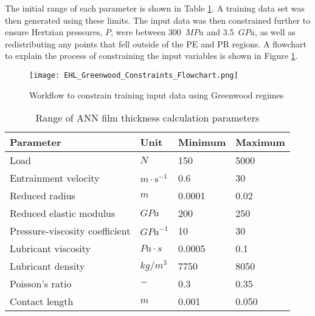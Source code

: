 The initial range of each parameter is shown in Table \ref{Range of ANN film thickness calculation parameters}. A training data set was then generated using these limits. The input data was then constrained further to ensure Hertzian pressures, $P$, were between 300~$MPa$ and 3.5~$GPa$, as well as redistributing any points that fell outside of the PE and PR regions. A flowchart to explain the process of constraining the input variables is shown in Figure \ref{EHL_Greenwood_Constraints_Flowchart}.

\begin{figure}
	\centering  
	\texttt{[image: EHL\_Greenwood\_Constraints\_Flowchart.png]}
	\caption{Workflow to constrain training input data using Greenwood regimes}
	\label{EHL_Greenwood_Constraints_Flowchart}
\end{figure} 



\begin{table*}
	\caption{Range of ANN film thickness calculation parameters}
	\label{Range of ANN film thickness calculation parameters}
	\centering
	\renewcommand{\arraystretch}{1.5}%
	\begin{tabular}{|P{0.4\textwidth}|P{0.15\textwidth}|P{0.15\textwidth}|P{0.15\textwidth}|}
		\hline
		\textbf{Parameter} & \textbf{Unit} & \textbf{Minimum} & \textbf{Maximum} \\ [0.5ex]
		\hline
		Load & $N$ & 150 & 5000 \\ [0.5ex]
		\hline
		Entrainment velocity & $m \cdot \mathrm{s}^{-1}$ & 0.6 & 30 \\ [0.5ex]
		\hline
		Reduced radius & $m$ & 0.0001 & 0.02 \\ [0.5ex]
		\hline
		Reduced elastic modulus & $GPa$ & 200 & 250 \\ [0.5ex]
		\hline
		Pressure-viscosity coefficient & ${GPa}^{-1}$ & 10 & 30 \\ [0.5ex]
		\hline
		Lubricant viscosity & $Pa \cdot s$ & 0.0005 & 0.1 \\ [0.5ex]
		\hline
		Lubricant density & ${kg}/{m}^3$ & 7750 & 8050 \\ [0.5ex]
		\hline
		Poisson's ratio & $-$ & 0.3 & 0.35 \\ [0.5ex]
		\hline
		Contact length & $m$ & 0.001 & 0.050 \\ [0.5ex]
		\hline
		
	\end{tabular}
\end{table*}

